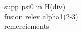 \documentclass{beamer}
\begin{document}

\begin{frame}
supp psi0 in H(div)\\
fusion relev alpha1(2-3)\\
remerciements
\end{frame}
\end{document}
